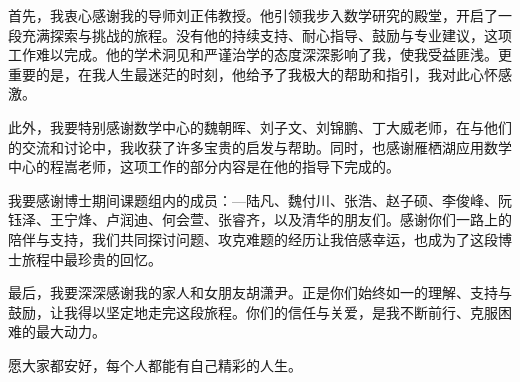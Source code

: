 
\begin{acknowledgements}
  首先，我衷心感谢我的导师刘正伟教授。他引领我步入数学研究的殿堂，开启了一段充满探索与挑战的旅程。没有他的持续支持、耐心指导、鼓励与专业建议，这项工作难以完成。他的学术洞见和严谨治学的态度深深影响了我，使我受益匪浅。更重要的是，在我人生最迷茫的时刻，他给予了我极大的帮助和指引，我对此心怀感激。

此外，我要特别感谢数学中心的魏朝晖、刘子文、刘锦鹏、丁大威老师，在与他们的交流和讨论中，我收获了许多宝贵的启发与帮助。同时，也感谢雁栖湖应用数学中心的程嵩老师，这项工作的部分内容是在他的指导下完成的。

我要感谢博士期间课题组内的成员：—陆凡、魏付川、张浩、赵子硕、李俊峰、阮钰泽、王宁烽、卢润迪、何会萱、张睿齐，以及清华的朋友们。感谢你们一路上的陪伴与支持，我们共同探讨问题、攻克难题的经历让我倍感幸运，也成为了这段博士旅程中最珍贵的回忆。

最后，我要深深感谢我的家人和女朋友胡潇尹。正是你们始终如一的理解、支持与鼓励，让我得以坚定地走完这段旅程。你们的信任与关爱，是我不断前行、克服困难的最大动力。

愿大家都安好，每个人都能有自己精彩的人生。
\end{acknowledgements}
